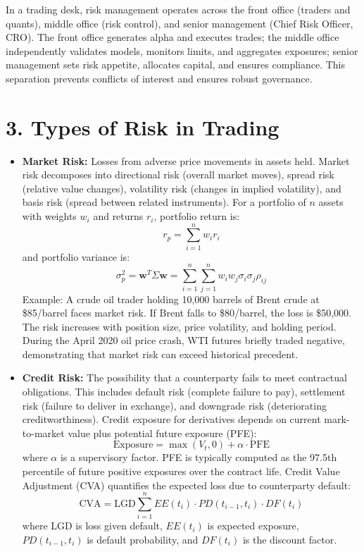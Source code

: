 \documentclass[11pt,a4paper]{article}
\begin{document}
In a trading desk, risk management operates across the front office (traders and quants), middle office (risk control), and senior management (Chief Risk Officer, CRO). The front office generates alpha and executes trades; the middle office independently validates models, monitors limits, and aggregates exposures; senior management sets risk appetite, allocates capital, and ensures compliance. This separation prevents conflicts of interest and ensures robust governance.

\section*{3. Types of Risk in Trading}

\begin{itemize}
    \item \textbf{Market Risk:} Losses from adverse price movements in assets held. Market risk decomposes into directional risk (overall market moves), spread risk (relative value changes), volatility risk (changes in implied volatility), and basis risk (spread between related instruments). For a portfolio of $n$ assets with weights $w_i$ and returns $r_i$, portfolio return is:
    \[
    r_p = \sum_{i=1}^n w_i r_i
    \]
    and portfolio variance is:
    \[
    \sigma_p^2 = \mathbf{w}^T \Sigma \mathbf{w} = \sum_{i=1}^n \sum_{j=1}^n w_i w_j \sigma_i \sigma_j \rho_{ij}
    \]
    Example: A crude oil trader holding 10,000 barrels of Brent crude at \$85/barrel faces market risk. If Brent falls to \$80/barrel, the loss is \$50,000. The risk increases with position size, price volatility, and holding period. During the April 2020 oil price crash, WTI futures briefly traded negative, demonstrating that market risk can exceed historical precedent.
    
    \item \textbf{Credit Risk:} The possibility that a counterparty fails to meet contractual obligations. This includes default risk (complete failure to pay), settlement risk (failure to deliver in exchange), and downgrade risk (deteriorating creditworthiness). Credit exposure for derivatives depends on current mark-to-market value plus potential future exposure (PFE):
    \[
    \text{Exposure} = \max(V_t, 0) + \alpha \cdot \text{PFE}
    \]
    where $\alpha$ is a supervisory factor. PFE is typically computed as the 97.5th percentile of future positive exposures over the contract life. Credit Value Adjustment (CVA) quantifies the expected loss due to counterparty default:
    \[
    \text{CVA} = \text{LGD} \sum_{i=1}^n EE(t_i) \cdot PD(t_{i-1}, t_i) \cdot DF(t_i)
    \]
    where LGD is loss given default, $EE(t_i)$ is expected exposure, $PD(t_{i-1}, t_i)$ is default probability, and $DF(t_i)$ is the discount factor.
    

\end{itemize}
\end{document}
